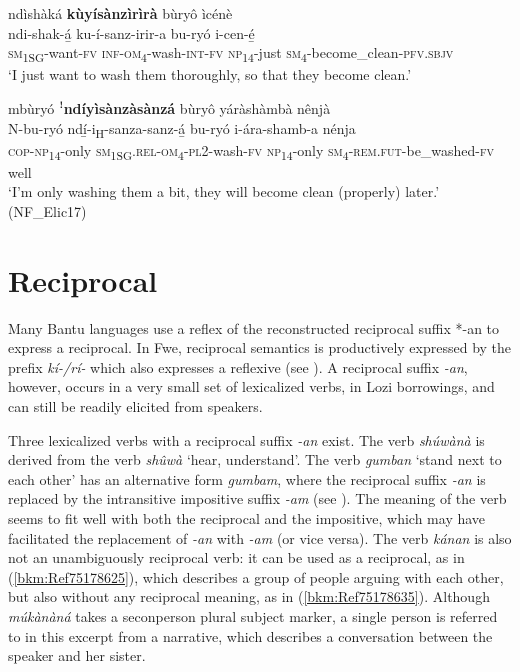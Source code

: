 \ea
\label{bkm:Ref75178478}
ndìshàká \textbf{kùyísànzìrìrà} bùryô ìcénè\\
\gll ndi-shak-á̲    ku-í-sanz-irir-a    bu-ryó i-cen-é̲ \\
\textsc{sm}\textsubscript{1SG}-want-\textsc{fv}  \textsc{inf}-\textsc{om}\textsubscript{4}-wash-\textsc{int}-\textsc{fv}  \textsc{np}\textsubscript{14}-just
\textsc{sm}\textsubscript{4}-become\_clean-\textsc{pfv}.\textsc{sbjv}\\
\glt ‘I just want to wash them thoroughly, so that they become clean.’
\z

\newpage
\ea
\label{bkm:Ref75178506}
mbùryó ꜝ\textbf{ndíyìsànzàsànzá} bùryô yáràshàmbà nênjà\\
\gll N-bu-ryó    ndí̲-i\textsubscript{H}-sanza-sanz-á̲      bu-ryó i-ára-shamb-a      nénja\\
\textsc{cop}-\textsc{np}\textsubscript{14}-only  \textsc{sm}\textsubscript{1SG}.\textsc{rel}-\textsc{om}\textsubscript{4}-\textsc{pl}2-wash-\textsc{fv}  \textsc{np}\textsubscript{14}-only
\textsc{sm}\textsubscript{4}-\textsc{rem}.\textsc{fut}-be\_washed-\textsc{fv}  well\\
\glt ‘I’m only washing them a bit, they will become clean (properly) later.’ (NF\_Elic17)
\z
\section{Reciprocal}
\hypertarget{Toc75352668}{}\label{bkm:Ref98773050}
Many Bantu languages use a reflex of the reconstructed reciprocal suffix *-an to express a reciprocal. In Fwe, reciprocal semantics is productively expressed by the prefix \textit{kí-/rí-} which also expresses a reflexive (see ). A reciprocal suffix \textit{-an}, however, occurs in a very small set of lexicalized verbs, in Lozi borrowings, and can still be readily elicited from speakers.

Three lexicalized verbs with a reciprocal suffix \textit{-an} exist. The verb \textit{shúwànà} is derived from the verb \textit{shûwà} ‘hear, understand’. The verb \textit{gumban} ‘stand next to each other’ has an alternative form \textit{gumbam}, where the reciprocal suffix \textit{-an} is replaced by the intransitive impositive suffix \textit{-am} (see ). The meaning of the verb seems to fit well with both the reciprocal and the impositive, which may have facilitated the replacement of \textit{-an} with \textit{-am} (or vice versa). The verb \textit{kánan} is also not an unambiguously reciprocal verb: it can be used as a reciprocal, as in (\ref{bkm:Ref75178625}), which describes a group of people arguing with each other, but also without any reciprocal meaning, as in (\ref{bkm:Ref75178635}). Although \textit{múkànàná} takes a seconperson plural subject marker, a single person is referred to in this excerpt from a narrative, which describes a conversation between the speaker and her sister.

